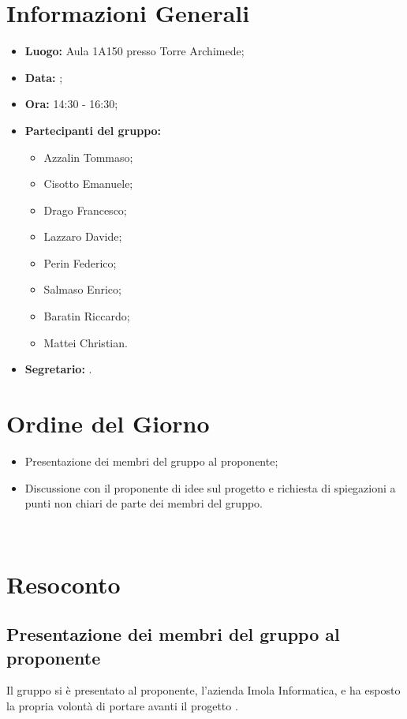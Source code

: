 \section{Informazioni Generali}
\begin{itemize}
\item \textbf{Luogo:} Aula 1A150 presso Torre Archimede;
\item \textbf{Data:} \Data;
\item \textbf{Ora:} 14:30 - 16:30;
\item \textbf{Partecipanti del gruppo:}
	\begin{itemize}
	\item Azzalin Tommaso; 
	\item Cisotto Emanuele; 
	\item Drago Francesco;
	\item Lazzaro Davide;
	\item Perin Federico;
	\item Salmaso Enrico;
	\item Baratin Riccardo;
	\item Mattei Christian.
	\end{itemize} 
\item \textbf{Segretario:} \Redattori.
\end{itemize}

\clearpage

\section{Ordine del Giorno}
\begin{itemize}
	\item Presentazione dei membri del gruppo al proponente;
	\item Discussione con il proponente di idee sul progetto e richiesta di spiegazioni a punti non chiari de parte dei membri del gruppo.
\end{itemize}

~\\

\section{Resoconto}
\subsection{Presentazione dei membri del gruppo al proponente}
Il gruppo si è presentato al proponente, l'azienda Imola Informatica, e ha esposto la propria volontà di portare avanti il progetto \NomeProgetto.


